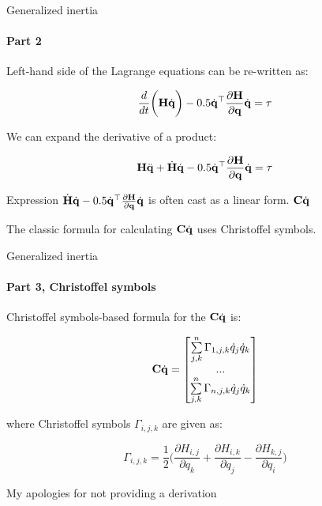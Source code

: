 \documentclass{beamer}
\begin{document}
\begin{frame}{Generalized inertia}
	\framesubtitle{Part 2}
	\begin{flushleft}
		
		Left-hand side of the Lagrange equations can be re-written as:
		
		\begin{equation}
			\frac{d}{dt} \bigg( 
			\mathbf{H} \dot{\mathbf{q}}
			\bigg) - 
			0.5 \dot{\mathbf{q}}^\top \frac{\partial \mathbf{H} }
			{\partial \mathbf{q}} \dot{\mathbf{q}} = \tau
		\end{equation}
		
		We can expand the derivative of a product:
		
		\begin{equation}
			\label{Lagrange_expanded}
			\mathbf{H} \ddot{\mathbf{q}} + \dot{\mathbf{H}} \dot{\mathbf{q}} - 
			0.5 \dot{\mathbf{q}}^\top \frac{\partial \mathbf{H} }
			{\partial \mathbf{q}} \dot{\mathbf{q}} = \tau
		\end{equation}
		
		Expression $\dot{\mathbf{H}} \dot{\mathbf{q}} - 
		0.5 \dot{\mathbf{q}}^\top \frac{\partial \mathbf{H} }
		{\partial \mathbf{q}} \dot{\mathbf{q}}$ is often cast as a linear form. $\mathbf{C}\dot{\mathbf{q}}$
		
		The classic formula for calculating $\mathbf{C}\dot{\mathbf{q}}$ uses Christoffel symbols.
		
	\end{flushleft}
\end{frame}


\begin{frame}{Generalized inertia}
	\framesubtitle{Part 3, Christoffel symbols}
	\begin{flushleft}
		
		Christoffel symbols-based formula for the $\mathbf{C}\dot{\mathbf{q}}$ is:
		
		\begin{equation}
			\mathbf{C}\dot{\mathbf{q}} = 
			\begin{bmatrix}
				\sum\limits_{j,k}^{n} \Gamma_{1,j,k} \dot{q}_j \dot{q}_k \\
				... \\
				\sum\limits_{j,k}^{n} \Gamma_{n,j,k} \dot{q}_j \dot{q}_k
			\end{bmatrix}
		\end{equation}
		
		where Christoffel symbols $\Gamma_{i,j,k}$ are given as:
		
		\begin{equation}
			\Gamma_{i,j,k} = \frac{1}{2} 
			\bigg( 
			\frac{\partial H_{i,j} }{\partial q_k} + 
			\frac{\partial H_{i,k} }{\partial q_j} - 
			\frac{\partial H_{k,j} }{\partial q_i}
			\bigg)
		\end{equation}
		
		\tiny{My apologies for not providing a derivation}
		
	\end{flushleft}
\end{frame}
\end{document}

